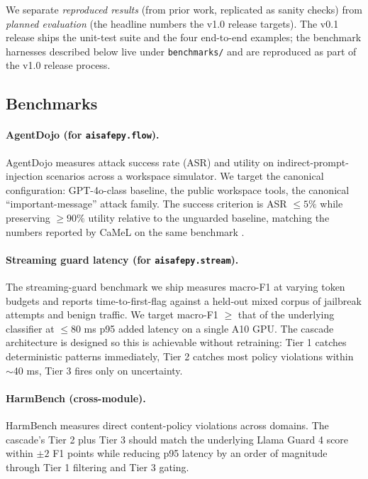 We separate \emph{reproduced results} (from prior work, replicated as
sanity checks) from \emph{planned evaluation} (the headline numbers
the v1.0 release targets). The v0.1 release ships the unit-test suite
and the four end-to-end examples; the benchmark harnesses described
below live under \texttt{benchmarks/} and are reproduced as part of
the v1.0 release process.

\subsection{Benchmarks}

\paragraph{AgentDojo (for \texttt{aisafepy.flow}).} AgentDojo
\citep{debenedetti2024agentdojo} measures attack success rate (ASR)
and utility on indirect-prompt-injection scenarios across a workspace
simulator. We target the canonical configuration: GPT-4o-class
baseline, the public workspace tools, the canonical
``important-message'' attack family. The success criterion is
ASR $\leq 5\%$ while preserving $\geq 90\%$ utility relative to the
unguarded baseline, matching the numbers reported by CaMeL on the
same benchmark \citep{camel2025}.

\paragraph{Streaming guard latency (for \texttt{aisafepy.stream}).}
The streaming-guard benchmark we ship measures macro-F1 at varying
token budgets and reports time-to-first-flag against a held-out
mixed corpus of jailbreak attempts and benign traffic. We target
macro-F1 $\geq$ that of the underlying classifier at $\leq$80 ms p95
added latency on a single A10 GPU. The cascade architecture is
designed so this is achievable without retraining: Tier 1 catches
deterministic patterns immediately, Tier 2 catches most policy
violations within $\sim$40 ms, Tier 3 fires only on uncertainty.

\paragraph{HarmBench (cross-module).} HarmBench
\citep{harmbench} measures direct content-policy violations across
domains. The cascade's Tier 2 plus Tier 3 should match the
underlying Llama Guard 4 score within $\pm 2$ F1 points while
reducing p95 latency by an order of magnitude through Tier 1
filtering and Tier 3 gating.

